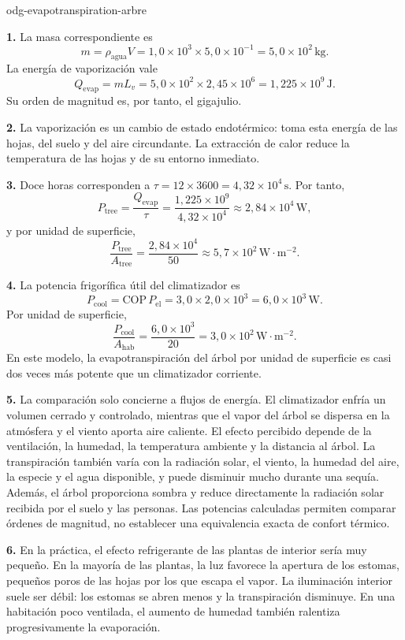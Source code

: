 \begin{exo}{odg-evapotranspiration-arbre}
\begin{solution}
\textbf{1.} La masa correspondiente es
\[
m=\rho_{\text{agua}}V
=1{,}0\times10^3\times5{,}0\times10^{-1}
=5{,}0\times10^2\,\text{kg}.
\]
La energía de vaporización vale
\[
Q_{\mathrm{evap}}=mL_v
=5{,}0\times10^2\times2{,}45\times10^6
=1{,}225\times10^9\,\text{J}.
\]
Su orden de magnitud es, por tanto, el gigajulio.

\textbf{2.} La vaporización es un cambio de estado endotérmico: toma esta energía de las hojas, del suelo y del aire circundante. La extracción de calor reduce la temperatura de las hojas y de su entorno inmediato.

\textbf{3.} Doce horas corresponden a $\tau=12\times3600=4{,}32\times10^4\,\text{s}$. Por tanto,
\[
P_{\text{tree}}=\frac{Q_{\mathrm{evap}}}{\tau}
=\frac{1{,}225\times10^9}{4{,}32\times10^4}
\approx2{,}84\times10^4\,\text{W},
\]
y por unidad de superficie,
\[
\frac{P_{\text{tree}}}{A_{\text{tree}}}
=\frac{2{,}84\times10^4}{50}
\approx5{,}7\times10^2\,\text{W}\!\cdot\!\text{m}^{-2}.
\]

\textbf{4.} La potencia frigorífica útil del climatizador es
\[
P_{\text{cool}}=\mathrm{COP}\,P_{\mathrm{el}}
=3{,}0\times2{,}0\times10^3
=6{,}0\times10^3\,\text{W}.
\]
Por unidad de superficie,
\[
\frac{P_{\text{cool}}}{A_{\text{hab}}}
=\frac{6{,}0\times10^3}{20}
=3{,}0\times10^2\,\text{W}\!\cdot\!\text{m}^{-2}.
\]
En este modelo, la evapotranspiración del árbol por unidad de superficie es casi dos veces más potente que un climatizador corriente.

\textbf{5.} La comparación solo concierne a flujos de energía. El climatizador enfría un volumen cerrado y controlado, mientras que el vapor del árbol se dispersa en la atmósfera y el viento aporta aire caliente. El efecto percibido depende de la ventilación, la humedad, la temperatura ambiente y la distancia al árbol. La transpiración también varía con la radiación solar, el viento, la humedad del aire, la especie y el agua disponible, y puede disminuir mucho durante una sequía. Además, el árbol proporciona sombra y reduce directamente la radiación solar recibida por el suelo y las personas. Las potencias calculadas permiten comparar órdenes de magnitud, no establecer una equivalencia exacta de confort térmico.

\textbf{6.} En la práctica, el efecto refrigerante de las plantas de interior sería muy pequeño. En la mayoría de las plantas, la luz favorece la apertura de los estomas, pequeños poros de las hojas por los que escapa el vapor. La iluminación interior suele ser débil: los estomas se abren menos y la transpiración disminuye. En una habitación poco ventilada, el aumento de humedad también ralentiza progresivamente la evaporación.


\end{solution}
\end{exo}

